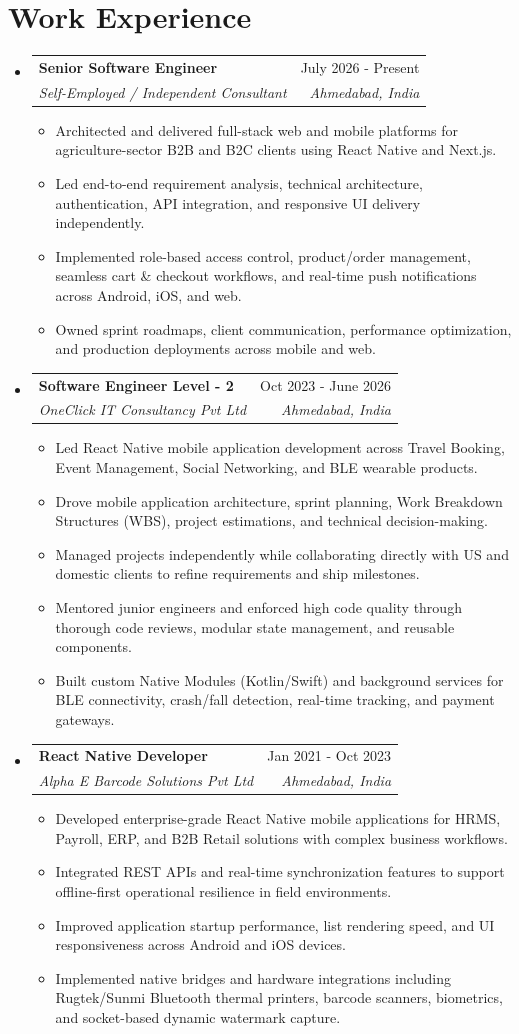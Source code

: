 \documentclass[letterpaper,10.5pt]{article}
\makeatletter
\newcommand{\resumeItem}[1]{
  \item\small{
    {#1 \vspace{-2pt}}
  }
}
\newcommand{\resumeSubheading}[4]{
  \vspace{-1pt}\item
    \begin{tabular*}{0.99\textwidth}[t]{l@{\extracolsep{\fill}}r}
      \textbf{#1} & \small #2 \\
      \textit{\small#3} & \textit{\small #4} \\
    \end{tabular*}\vspace{-6pt}
}
\newcommand{\resumeSubHeadingListStart}{\begin{itemize}[leftmargin=0.0in, label={}]}
\newcommand{\resumeSubHeadingListEnd}{\end{itemize}}
\newcommand{\resumeItemListStart}{\begin{itemize}[leftmargin=0.16in]}
\newcommand{\resumeItemListEnd}{\end{itemize}\vspace{-4pt}}
\makeatother
\begin{document}
\section{Work Experience}
\resumeSubHeadingListStart
\resumeSubheading
  {Senior Software Engineer}{July 2026 - Present}
  {Self-Employed / Independent Consultant}{Ahmedabad, India}
  \resumeItemListStart
    \resumeItem{Architected and delivered full-stack web and mobile platforms for agriculture-sector B2B and B2C clients using React Native and Next.js.}
    \resumeItem{Led end-to-end requirement analysis, technical architecture, authentication, API integration, and responsive UI delivery independently.}
    \resumeItem{Implemented role-based access control, product/order management, seamless cart \& checkout workflows, and real-time push notifications across Android, iOS, and web.}
    \resumeItem{Owned sprint roadmaps, client communication, performance optimization, and production deployments across mobile and web.}
  \resumeItemListEnd

\resumeSubheading
  {Software Engineer Level - 2}{Oct 2023 - June 2026}
  {OneClick IT Consultancy Pvt Ltd}{Ahmedabad, India}
  \resumeItemListStart
    \resumeItem{Led React Native mobile application development across Travel Booking, Event Management, Social Networking, and BLE wearable products.}
    \resumeItem{Drove mobile application architecture, sprint planning, Work Breakdown Structures (WBS), project estimations, and technical decision-making.}
    \resumeItem{Managed projects independently while collaborating directly with US and domestic clients to refine requirements and ship milestones.}
    \resumeItem{Mentored junior engineers and enforced high code quality through thorough code reviews, modular state management, and reusable components.}
    \resumeItem{Built custom Native Modules (Kotlin/Swift) and background services for BLE connectivity, crash/fall detection, real-time tracking, and payment gateways.}
  \resumeItemListEnd

\resumeSubheading
  {React Native Developer}{Jan 2021 - Oct 2023}
  {Alpha E Barcode Solutions Pvt Ltd}{Ahmedabad, India}
  \resumeItemListStart
    \resumeItem{Developed enterprise-grade React Native mobile applications for HRMS, Payroll, ERP, and B2B Retail solutions with complex business workflows.}
    \resumeItem{Integrated REST APIs and real-time synchronization features to support offline-first operational resilience in field environments.}
    \resumeItem{Improved application startup performance, list rendering speed, and UI responsiveness across Android and iOS devices.}
    \resumeItem{Implemented native bridges and hardware integrations including Rugtek/Sunmi Bluetooth thermal printers, barcode scanners, biometrics, and socket-based dynamic watermark capture.}
  \resumeItemListEnd
\resumeSubHeadingListEnd
\vspace{-6pt}
\end{document}
